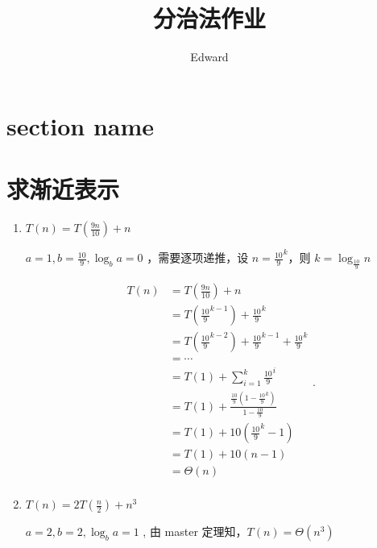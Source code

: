 \documentclass[UTF8]{ctexart}
\title{分治法作业}
\author{Edward}
\begin{document}
\maketitle


\section{section name}%
\label{sec:section_name}



\section{求渐近表示}%
\label{sec:求渐近表示}


\begin{enumerate}
    \item $ T\left( n \right)  = T\left( \frac{9n}{10}\right)+n  $  

        $ a=1, b=\frac{10}{9}, \log_b a = 0 $ ，需要逐项递推，设 $ n = \frac{10}{9}^{k}$，则 $ k = \log_{\frac{10}{9}}n $  

        \[
            \begin{aligned}
                T\left( n \right) &= T\left( \frac{9n}{10} \right)  + n\\
                &=  T\left( \frac{10}{9}^{k-1} \right) + \frac{10}{9}^{k}\\
                &=  T\left( \frac{10}{9}^{k-2} \right) + \frac{10}{9}^{k-1} + \frac{10}{9}^{k}\\
                &= \cdots \\
                &= T\left( 1 \right)  + \sum_{i=1}^{k} \frac{10}{9}^{i}\\
                &= T\left( 1 \right) + \frac{\frac{10}{9} \left( 1-\frac{10}{9}^{k} \right) }{1-\frac{10}{9}}  \\
                &= T\left( 1 \right) +  10\left( \frac{10}{9}^{k}-1 \right) \\
                &= T\left( 1 \right) + 10\left( n-1 \right)  \\
                &= \Theta \left( n \right)  \\
            \end{aligned}
        .\] 

    \item $ T\left( n \right) = 2 T\left( \frac{n}{2}\right) + n^{3}  $ 

        $ a = 2, b = 2, \log_b a = 1 $ , 由 master 定理知，$ T\left( n \right) = \Theta\left( n^{3}  \right)  $ 


\end{enumerate}
\end{document}
